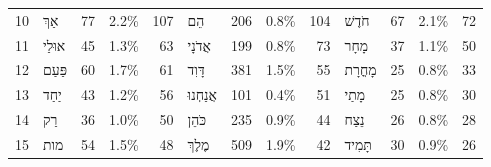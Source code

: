 \begin{table}[htbp!]
\begin{adjustbox}{width=1\textwidth}
\begin{tabular}{llrlrlrlrlrlr}
10   &      \texthebrew{אַךְ} &     77 &   2.2\% &     107 &        \texthebrew{הֵם} &    206 &  0.8\% &     104 &   \texthebrew{חֹדֶשׁ} &     67 &   2.1\% &      72 \\
11   &    \texthebrew{אוּלַי} &     45 &   1.3\% &      63 &    \texthebrew{אֲדֹנָי} &    199 &  0.8\% &      73 &    \texthebrew{מָחָר} &     37 &   1.1\% &      50 \\
12   &    \texthebrew{פַּעַם} &     60 &   1.7\% &      61 &     \texthebrew{דָּוִד} &    381 &  1.5\% &      55 &  \texthebrew{מָחֳרָת} &     25 &   0.8\% &      33 \\
13   &     \texthebrew{יַחַד} &     43 &   1.2\% &      56 &  \texthebrew{אֲנַחְנוּ} &    101 &  0.4\% &      51 &    \texthebrew{מָתַי} &     25 &   0.8\% &      30 \\
14   &       \texthebrew{רַק} &     36 &   1.0\% &      50 &     \texthebrew{כֹּהֵן} &    235 &  0.9\% &      44 &    \texthebrew{נֵצַח} &     26 &   0.8\% &      28 \\
15   &       \texthebrew{מות} &     54 &   1.5\% &      48 &     \texthebrew{מֶלֶךְ} &    509 &  1.9\% &      42 &  \texthebrew{תָּמִיד} &     30 &   0.9\% &      26 \\
\bottomrule
\end{tabular}
\end{adjustbox}
\end{table}
